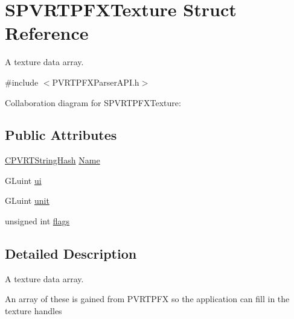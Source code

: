 \hypertarget{struct_s_p_v_r_t_p_f_x_texture}{\section{S\+P\+V\+R\+T\+P\+F\+X\+Texture Struct Reference}
\label{struct_s_p_v_r_t_p_f_x_texture}
}


A texture data array.  




{\ttfamily \#include $<$P\+V\+R\+T\+P\+F\+X\+Parser\+A\+P\+I.\+h$>$}



Collaboration diagram for S\+P\+V\+R\+T\+P\+F\+X\+Texture\+:
\subsection*{Public Attributes}
\begin{DoxyCompactItemize}
\item 
\hyperlink{class_c_p_v_r_t_string_hash}{C\+P\+V\+R\+T\+String\+Hash} \hyperlink{struct_s_p_v_r_t_p_f_x_texture_ab657d187ca89d625681c121aa21608a5}{Name}
\item 
G\+Luint \hyperlink{struct_s_p_v_r_t_p_f_x_texture_ae42c124254b7916502bba78f856c95fc}{ui}
\item 
G\+Luint \hyperlink{struct_s_p_v_r_t_p_f_x_texture_a304eab91772998aab442b7c0f02535be}{unit}
\item 
unsigned int \hyperlink{struct_s_p_v_r_t_p_f_x_texture_ae1e94f4103dff9c2005375e77e757520}{flags}
\end{DoxyCompactItemize}


\subsection{Detailed Description}
A texture data array. 





An array of these is gained from P\+V\+R\+T\+P\+F\+X so the application can fill in the texture handles 

